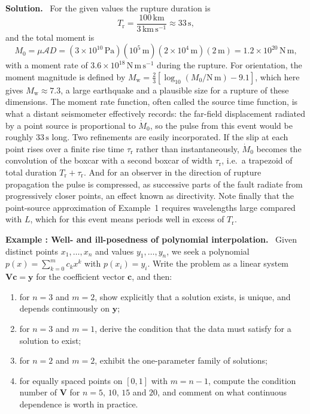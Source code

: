 \documentclass[a4paper,12pt]{paper}
\newcounter{example}
\renewenvironment{example}[1]{%
  \refstepcounter{example}%
  \begin{mdframed}[linewidth=1pt,innertopmargin=6pt,innerbottommargin=6pt]%
  \noindent\textbf{Example \theexample: #1.}\ }{%
  \end{mdframed}}
\newenvironment{solution}{\par\noindent\textbf{Solution.}\ }{\par\medskip}
\begin{document}
\begin{solution}
For the given values the rupture duration is
\begin{equation}
T_{\mathrm{r}}=\frac{100\,\mathrm{km}}{3\,\mathrm{km\,s^{-1}}}\approx33\,\mathrm{s},
\label{eq:32}
\end{equation}
and the total moment is
\begin{equation}
M_{0}=\mu\mathcal{A}D=\left(3\times10^{10}\,\mathrm{Pa}\right)
\left(10^{5}\,\mathrm{m}\right)\left(2\times10^{4}\,\mathrm{m}\right)\left(2\,\mathrm{m}\right)
=1.2\times10^{20}\,\mathrm{N\,m},
\label{eq:33}
\end{equation}
with a moment rate of $3.6\times10^{18}\,\mathrm{N\,m\,s^{-1}}$ during the rupture. For
orientation, the moment magnitude is defined by
$M_{\mathrm{w}}=\tfrac{2}{3}\left[\log_{10}(M_{0}/\mathrm{N\,m})-9.1\right]$, which here
gives $M_{\mathrm{w}}\approx7.3$, a large earthquake and a plausible size for a rupture of
these dimensions. The moment rate function, often called the source time function, is
what a distant seismometer effectively records: the far-field displacement radiated by a
point source is proportional to $\dot{M}_{0}$, so the pulse from this event would be
roughly $33\,\mathrm{s}$ long. Two refinements are easily incorporated. If the slip at each
point rises over a finite rise time $\tau_{\mathrm{r}}$ rather than instantaneously,
$\dot{M}_{0}$ becomes the convolution of the boxcar with a second boxcar of width
$\tau_{\mathrm{r}}$, i.e.\ a trapezoid of total duration $T_{\mathrm{r}}+\tau_{\mathrm{r}}$.
And for an observer in the direction of rupture propagation the pulse is compressed, as
successive parts of the fault radiate from progressively closer points, an effect known
as directivity. Note finally that the point-source approximation of Example~1 requires
wavelengths large compared with $L$, which for this event means periods well in excess of
$T_{\mathrm{r}}$.
\end{solution}

\newpage
\begin{example}{Well- and ill-posedness of polynomial interpolation}
Given distinct points $x_{1},\dots,x_{n}$ and values $y_{1},\dots,y_{n}$, we seek a
polynomial $p(x)=\sum_{k=0}^{m}c_{k}x^{k}$ with $p(x_{i})=y_{i}$. Write the problem as a
linear system $\mathbf{V}\mathbf{c}=\mathbf{y}$ for the coefficient vector $\mathbf{c}$,
and then:
\begin{enumerate}
    \item[(a)] for $n=3$ and $m=2$, show explicitly that a solution exists, is unique, and
    depends continuously on $\mathbf{y}$;
    \item[(b)] for $n=3$ and $m=1$, derive the condition that the data must satisfy for a
    solution to exist;
    \item[(c)] for $n=2$ and $m=2$, exhibit the one-parameter family of solutions;
    \item[(d)] for equally spaced points on $[0,1]$ with $m=n-1$, compute the condition
    number of $\mathbf{V}$ for $n=5$, $10$, $15$ and $20$, and comment on what continuous
    dependence is worth in practice.
\end{enumerate}
\end{example}
\end{document}
